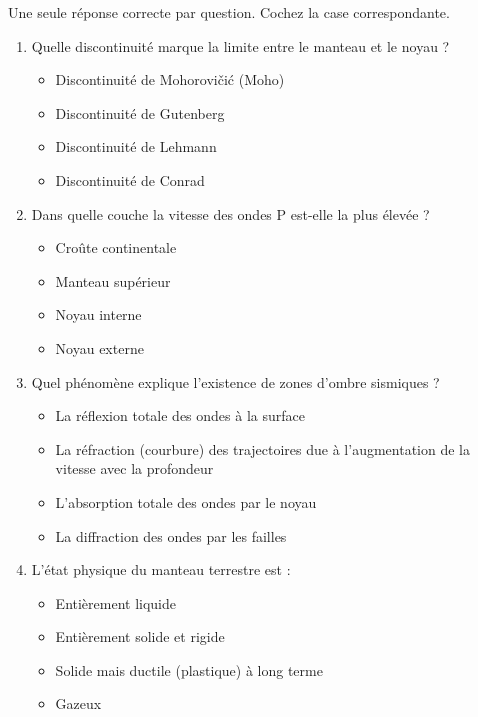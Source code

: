 \documentclass[11pt]{article}
\begin{document}
\begin{exercice}
Une seule réponse correcte par question. Cochez la case correspondante.
\begin{enumerate}
    \item Quelle discontinuité marque la limite entre le manteau et le noyau ?
\begin{itemize}
        \item[$\square$] Discontinuité de Mohorovičić (Moho)
        \item[$\square$] Discontinuité de Gutenberg
        \item[$\square$] Discontinuité de Lehmann
        \item[$\square$] Discontinuité de Conrad
    \end{itemize}
    \item Dans quelle couche la vitesse des ondes P est-elle la plus élevée ?
\begin{itemize}
        \item[$\square$] Croûte continentale
        \item[$\square$] Manteau supérieur
        \item[$\square$] Noyau interne
        \item[$\square$] Noyau externe
    \end{itemize}
    \item Quel phénomène explique l'existence de zones d'ombre sismiques ?
\begin{itemize}
        \item[$\square$] La réflexion totale des ondes à la surface
        \item[$\square$] La réfraction (courbure) des trajectoires due à l'augmentation de la vitesse avec la profondeur
        \item[$\square$] L'absorption totale des ondes par le noyau
        \item[$\square$] La diffraction des ondes par les failles
    \end{itemize}
    \item L'état physique du manteau terrestre est :
\begin{itemize}
        \item[$\square$] Entièrement liquide
        \item[$\square$] Entièrement solide et rigide
        \item[$\square$] Solide mais ductile (plastique) à long terme
        \item[$\square$] Gazeux
    \end{itemize}
\end{enumerate}
\end{exercice}
\end{document}
